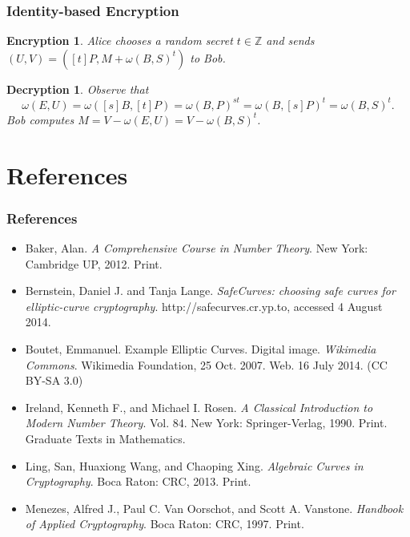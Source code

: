 \documentclass{beamer}
\newtheorem{encryption}{Encryption}
\newtheorem{decryption}{Decryption}
\begin{document}
    \begin{frame}
        \frametitle{Identity-based Encryption}
        \begin{encryption}
            Alice chooses a random secret \(t \in \mathbb{Z}\) and sends
            \((U, V) = ([t]P, M + \omega(B, S)^t)\) to Bob.
        \end{encryption}
        \vfill
        \begin{decryption}
            Observe that \[\omega(E, U) = \omega([s]B, [t]P) =
            \omega(B, P)^{st} = \omega(B, [s]P)^t = \omega(B, S)^t.\]
            Bob computes \(M = V - \omega(E, U) = V - \omega(B, S)^t\).
        \end{decryption}
    \end{frame}

    \section{References}
    \begin{frame}[allowframebreaks]
        \frametitle{References}
        \begin{itemize}
            \item Baker, Alan. \emph{A Comprehensive Course in Number Theory}.
                New York: Cambridge UP, 2012. Print.
            \item Bernstein, Daniel J. and Tanja Lange. \emph{SafeCurves:
                choosing safe curves for elliptic-curve cryptography}.
                http://safecurves.cr.yp.to, accessed 4 August 2014.
            \item Boutet, Emmanuel. Example Elliptic Curves. Digital image.
                \emph{Wikimedia Commons}.
                Wikimedia Foundation, 25 Oct. 2007.
                Web. 16 July 2014. (CC BY-SA 3.0)
            \item Ireland, Kenneth F., and Michael I. Rosen. \emph{A Classical
                Introduction to Modern Number Theory}. Vol. 84. New York:
                Springer-Verlag, 1990. Print. Graduate Texts in Mathematics.
            \item Ling, San, Huaxiong Wang, and Chaoping Xing. \emph{Algebraic
                Curves in Cryptography}. Boca Raton: CRC, 2013. Print.
            \item Menezes, Alfred J., Paul C. Van Oorschot, and
                Scott A. Vanstone. \emph{Handbook of Applied Cryptography}.
                Boca Raton: CRC, 1997. Print.
        \end{itemize}
    \end{frame}
\end{document}
